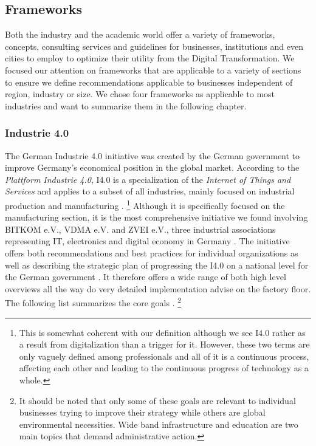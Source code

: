 \subsection{Frameworks}
\label{subsec:frameworks}



Both the industry and the academic world offer a variety of frameworks, concepts, consulting services and guidelines for businesses, institutions and even cities to employ to optimize their utility from the Digital Transformation.
We focused our attention on frameworks that are applicable to a variety of sections to ensure we define recommendations applicable to businesses independent of region, industry or size. 
We chose four frameworks as applicable to most industries and want to summarize them in the following chapter.

\subsubsection{Industrie 4.0}
The German Industrie 4.0 initiative was created by the German government to improve Germany's economical position in the global market. According to the \emph{Plattform Industrie 4.0}, I4.0 is a specialization of the \emph{Internet of Things and Services} and applies to a subset of all industries, mainly focused on industrial production and manufacturing \cite[p.41]{umsetzungsstrategie:2015}.
\footnote{This is somewhat coherent with our definition although we see \ac{I4.0} rather as a result from digitalization than a trigger for it. However, these two terms are only vaguely defined among professionals and all of it is a continuous process, affecting each other and leading to the continuous progress of technology as a whole.} 
Although it is specifically focused on the manufacturing section, it is the most comprehensive initiative we found involving BITKOM e.V., VDMA e.V. and ZVEI e.V., three industrial associations representing IT, electronics and digital economy in Germany \cite{zveimembers:2016, vdmamembers:2016, bitkommembers:2016}. The initiative offers both recommendations and best practices for individual organizations \cite[p.40ff.]{umsetzungsstrategie:2015} as well as describing the strategic plan of progressing the \ac{I4.0} on a national level for the German government \cite[p.15ff.]{umsetzungsstrategie:2015}. It therefore offers a wide range of both high level overviews all the way do very detailed implementation advise on the factory floor.
 The following list summarizes the core goals \cite[p.8]{umsetzungsstrategie:2015}. \footnote{It should be noted that only some of these goals are relevant to individual businesses trying to improve their strategy while others are global environmental necessities. Wide band infrastructure and education are two main topics that demand administrative action.}

